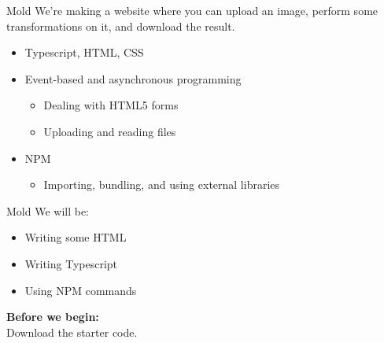\documentclass[../index.tex]{subfiles}
\begin{document}

\renewcommand{\currenttitle}{Mold}
\begin{frame}[fragile]{\currenttitle}
  We're making a website where you can upload an image, perform some
  transformations on it, and download the result.

  \begin{itemize}
    \item Typescript, HTML, CSS
    \item Event-based and asynchronous programming
      \begin{itemize} 
        \item Dealing with HTML5 forms
        \item Uploading and reading files
      \end{itemize}
    \item NPM
      \begin{itemize}
        \item Importing, bundling, and using external libraries
      \end{itemize}
  \end{itemize}
\end{frame}

\begin{frame}[fragile]{\currenttitle}
  We will be:
  \begin{itemize}
    \item Writing some HTML
    \item Writing Typescript
    \item Using NPM commands
  \end{itemize}

  \vspace*{1em}

  \textbf{Before we begin:} \\
  Download the starter code\footnotemark{}.

\end{frame}

\end{document}
